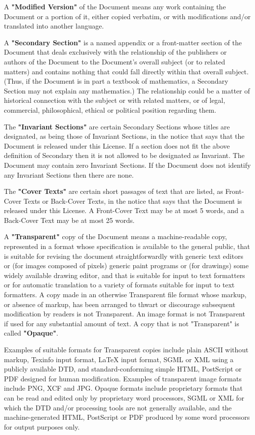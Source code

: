 \documentclass[a4paper,12pt]{book}
\begin{document}
A \textbf{"Modified Version"} of the Document means any work containing the
Document or a portion of it, either copied verbatim, or with
modifications and/or translated into another language.

A \textbf{"Secondary Section"} is a named appendix or a front-matter section of
the Document that deals exclusively with the relationship of the
publishers or authors of the Document to the Document's overall subject
(or to related matters) and contains nothing that could fall directly
within that overall subject.  (Thus, if the Document is in part a
textbook of mathematics, a Secondary Section may not explain any
mathematics.)  The relationship could be a matter of historical
connection with the subject or with related matters, or of legal,
commercial, philosophical, ethical or political position regarding
them.

The \textbf{"Invariant Sections"} are certain Secondary Sections whose titles
are designated, as being those of Invariant Sections, in the notice
that says that the Document is released under this License.  If a
section does not fit the above definition of Secondary then it is not
allowed to be designated as Invariant.  The Document may contain zero
Invariant Sections.  If the Document does not identify any Invariant
Sections then there are none.

The \textbf{"Cover Texts"} are certain short passages of text that are listed,
as Front-Cover Texts or Back-Cover Texts, in the notice that says that
the Document is released under this License.  A Front-Cover Text may
be at most 5 words, and a Back-Cover Text may be at most 25 words.

A \textbf{"Transparent"} copy of the Document means a machine-readable copy,
represented in a format whose specification is available to the
general public, that is suitable for revising the document
straightforwardly with generic text editors or (for images composed of
pixels) generic paint programs or (for drawings) some widely available
drawing editor, and that is suitable for input to text formatters or
for automatic translation to a variety of formats suitable for input
to text formatters.  A copy made in an otherwise Transparent file
format whose markup, or absence of markup, has been arranged to thwart
or discourage subsequent modification by readers is not Transparent.
An image format is not Transparent if used for any substantial amount
of text.  A copy that is not "Transparent" is called \textbf{"Opaque"}.

Examples of suitable formats for Transparent copies include plain
ASCII without markup, Texinfo input format, LaTeX input format, SGML
or XML using a publicly available DTD, and standard-conforming simple
HTML, PostScript or PDF designed for human modification.  Examples of
transparent image formats include PNG, XCF and JPG.  Opaque formats
include proprietary formats that can be read and edited only by
proprietary word processors, SGML or XML for which the DTD and/or
processing tools are not generally available, and the
machine-generated HTML, PostScript or PDF produced by some word
processors for output purposes only.
\end{document}
